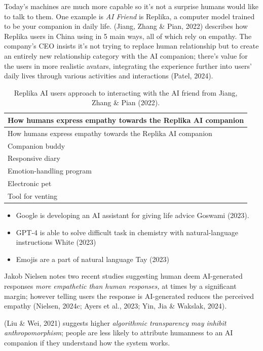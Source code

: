 \documentclass[
  letterpaper,
  DIV=11,
  numbers=noendperiod]{scrartcl}
\providecommand{\tightlist}{%
  \setlength{\itemsep}{0pt}\setlength{\parskip}{0pt}}\usepackage{longtable,booktabs,array}
\begin{document}
Today's machines are much more capable so it's not a surprise humans
would like to talk to them. One example is \emph{AI Friend} is Replika,
a computer model trained to be your companion in daily life. (Jiang,
Zhang \& Pian, 2022) describes how Replika users in China using in 5
main ways, all of which rely on empathy. The company's CEO insists it's
not trying to replace human relationship but to create an entirely new
relationship category with the AI companion; there's value for the users
in more realistic avatars, integrating the experience further into
users' daily lives through various activities and interactions (Patel,
2024).

\begin{longtable}[]{@{}l@{}}
\caption{Replika AI users approach to interacting with the AI friend
from Jiang, Zhang \& Pian (2022).}\tabularnewline
\toprule\noalign{}
How humans express empathy towards the Replika AI companion \\
\midrule\noalign{}
\endfirsthead
\toprule\noalign{}
How humans express empathy towards the Replika AI companion \\
\midrule\noalign{}
\endhead
\bottomrule\noalign{}
\endlastfoot
Companion buddy \\
Responsive diary \\
Emotion-handling program \\
Electronic pet \\
Tool for venting \\
\end{longtable}

\begin{itemize}
\tightlist
\item
  Google is developing an AI assistant for giving life advice Goswami
  (2023).
\item
  GPT-4 is able to solve difficult task in chemistry with
  natural-language instructions White (2023)
\item
  Emojis are a part of natural language Tay (2023)
\end{itemize}

Jakob Nielsen notes two recent studies suggesting human deem
AI-generated responses \emph{more empathetic than human responses,} at
times by a significant margin; however telling users the response is
AI-generated reduces the perceived empathy (Nielsen, 2024c; Ayers et
al., 2023; Yin, Jia \& Wakslak, 2024).

(Liu \& Wei, 2021) suggests higher \emph{algorithmic transparency may
inhibit anthropomorphism}; people are less likely to attribute humanness
to an AI companion if they understand how the system works.
\end{document}
